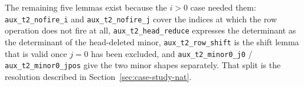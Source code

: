 The remaining five lemmas exist because the $i > 0$ case needed them:
\texttt{aux\_t2\_nofire\_i} and \texttt{aux\_t2\_nofire\_j} cover the indices
at which the row operation does not fire at all, \texttt{aux\_t2\_head\_reduce}
expresses the determinant as the determinant of the head-deleted minor,
\texttt{aux\_t2\_row\_shift} is the shift lemma that is valid once $j = 0$ has
been excluded, and \texttt{aux\_t2\_minor0\_j0} / \texttt{aux\_t2\_minor0\_jpos}
give the two minor shapes separately. That split is the resolution described in
Section~\ref{sec:case-study-nat}.
